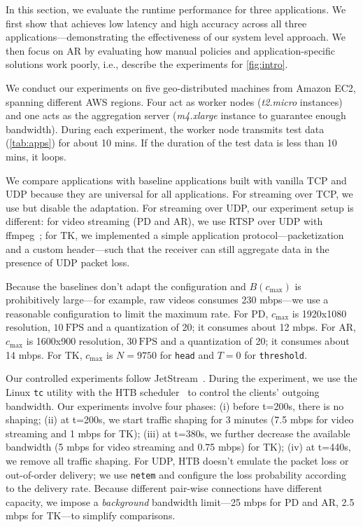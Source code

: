 In this section, we evaluate the runtime performance for three applications. We
first show that \sysname{} achieves low latency and high accuracy across all
three applications---demonstrating the effectiveness of our system level
approach. We then focus on AR by evaluating how manual policies and
application-specific solutions work poorly, i.e., describe the experiments for
\autoref{fig:intro}.

We conduct our experiments on five geo-distributed machines from Amazon EC2,
spanning different AWS regions. Four act as worker nodes (\textit{t2.micro}
instances) and one acts as the aggregation server (\textit{m4.xlarge} instance
to guarantee enough bandwidth). During each experiment, the worker node
transmits test data (\autoref{tab:apps}) for about 10 mins. If the duration of
the test data is less than 10 mins, it loops.

We compare \sysname{} applications with baseline applications built with vanilla
TCP and UDP because they are universal for all applications. For streaming over
TCP, we use \sysname{} but disable the adaptation. For streaming over UDP, our
experiment setup is different: for video streaming (PD and AR), we use RTSP over
UDP with ffmpeg~\cite{bellard2012ffmpeg}; for TK, we implemented a simple
application protocol---packetization and a custom header---such that the receiver
can still aggregate data in the presence of UDP packet loss.

Because the baselines don't adapt the configuration and $B(c_{\max})$ is
prohibitively large---for example, raw videos consumes 230 mbps---we use a
reasonable configuration to limit the maximum rate. For PD, $c_{\max}$ is
1920x1080 resolution, \(10~\text{FPS}\) and a quantization of 20; it consumes about 12
mbps. For AR, $c_{\max}$ is 1600x900 resolution, \(30~\text{FPS}\) and a quantization of 20;
it consumes about 14 mbps.
For TK, $c_{\max}$ is $N=9750$ for \texttt{head} and $T=0$ for \texttt{threshold}.

Our controlled experiments follow  JetStream~\cite{rabkin2014aggregation}. During
the experiment, we use the Linux \texttt{tc} utility with the HTB scheduler~\cite{lartc,
  htb} to control the clients' outgoing bandwidth. Our experiments
involve four phases: (i) before t=200s, there is no shaping; (ii) at
t=200s, we start traffic shaping for 3 minutes (7.5 mbps for video
streaming and 1 mbps for TK); (iii) at t=380s, we further decrease the
available bandwidth (5 mbps for video streaming and 0.75 mbps) for TK);
(iv) at t=440s, we remove all traffic shaping. For UDP, HTB doesn't emulate the
packet loss or out-of-order delivery; we use \texttt{netem} and configure the
loss probability according to the delivery rate. Because different pair-wise
connections have different capacity, we impose a \textit{background} bandwidth
limit---25 mbps for PD and AR, 2.5 mbps for TK---to simplify comparisons.

